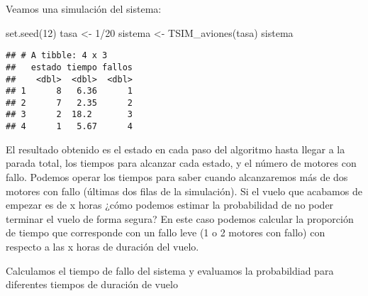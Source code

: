 \documentclass[
]{book}
\newenvironment{Shaded}{\begin{snugshade}}{\end{snugshade}}
\newcommand{\AttributeTok}[1]{\textcolor[rgb]{0.77,0.63,0.00}{#1}}
\newcommand{\CommentTok}[1]{\textcolor[rgb]{0.56,0.35,0.01}{\textit{#1}}}
\newcommand{\ControlFlowTok}[1]{\textcolor[rgb]{0.13,0.29,0.53}{\textbf{#1}}}
\newcommand{\DecValTok}[1]{\textcolor[rgb]{0.00,0.00,0.81}{#1}}
\newcommand{\FloatTok}[1]{\textcolor[rgb]{0.00,0.00,0.81}{#1}}
\newcommand{\FunctionTok}[1]{\textcolor[rgb]{0.00,0.00,0.00}{#1}}
\newcommand{\NormalTok}[1]{#1}
\newcommand{\OtherTok}[1]{\textcolor[rgb]{0.56,0.35,0.01}{#1}}
\newcommand{\SpecialCharTok}[1]{\textcolor[rgb]{0.00,0.00,0.00}{#1}}
\theoremstyle{definition}
\theoremstyle{definition}
\theoremstyle{definition}
\theoremstyle{definition}
\theoremstyle{remark}
\begin{document}
Veamos una simulación del sistema:

\begin{Shaded}
\begin{Highlighting}[]
\FunctionTok{set.seed}\NormalTok{(}\DecValTok{12}\NormalTok{)}
\NormalTok{tasa }\OtherTok{\textless{}{-}} \DecValTok{1}\SpecialCharTok{/}\DecValTok{20}
\NormalTok{sistema }\OtherTok{\textless{}{-}} \FunctionTok{TSIM\_aviones}\NormalTok{(tasa)}
\NormalTok{sistema}
\end{Highlighting}
\end{Shaded}

\begin{verbatim}
## # A tibble: 4 x 3
##   estado tiempo fallos
##    <dbl>  <dbl>  <dbl>
## 1      8   6.36      1
## 2      7   2.35      2
## 3      2  18.2       3
## 4      1   5.67      4
\end{verbatim}

El resultado obtenido es el estado en cada paso del algoritmo hasta llegar a la parada total, los tiempos para alcanzar cada estado, y el número de motores con fallo. Podemos operar los tiempos para saber cuando alcanzaremos más de dos motores con fallo (últimas dos filas de la simulación). Si el vuelo que acabamos de empezar es de x horas ¿cómo podemos estimar la probabilidad de no poder terminar el vuelo de forma segura? En este caso podemos calcular la proporción de tiempo que corresponde con un fallo leve (1 o 2 motores con fallo) con respecto a las x horas de duración del vuelo.

Calculamos el tiempo de fallo del sistema y evaluamos la probabildiad para diferentes tiempos de duración de vuelo

\begin{Shaded}
\end{Shaded}
\end{document}

